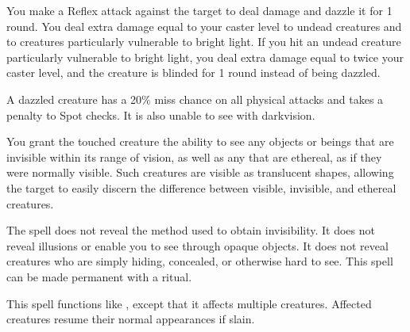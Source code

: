 \spellrng{\rngclose}
\begin{spelleffect}
    You make a Reflex attack against the target to deal damage and dazzle it for 1 round. You deal extra damage equal to your caster level to undead creatures and to creatures particularly vulnerable to bright light. If you hit an undead creature particularly vulnerable to bright light, you deal extra damage equal to twice your caster level, and the creature is blinded for 1 round instead of being dazzled.
\end{spelleffect}
\begin{spellnotes}
  A dazzled creature has a 20\% miss chance on all physical attacks and takes a  penalty to Spot checks. It is also unable to see with darkvision.
\end{spellnotes}

\begin{spelleffect}
  You grant the touched creature the ability to see any objects or beings that are invisible within its range of vision, as well as any that are ethereal, as if they were normally visible. Such creatures are visible as translucent shapes, allowing the target to easily discern the difference between visible, invisible, and ethereal creatures.
\end{spelleffect}
\begin{spellnotes}
  The spell does not reveal the method used to obtain invisibility. It does not reveal illusions or enable you to see through opaque objects. It does not reveal creatures who are simply hiding, concealed, or otherwise hard to see.
This spell can be made permanent with a  ritual.
\end{spellnotes}

\spellrng{\rngclose}
\begin{spelleffect}
  This spell functions like , except that it affects multiple creatures. Affected creatures resume their normal appearances if slain.
\end{spelleffect}


